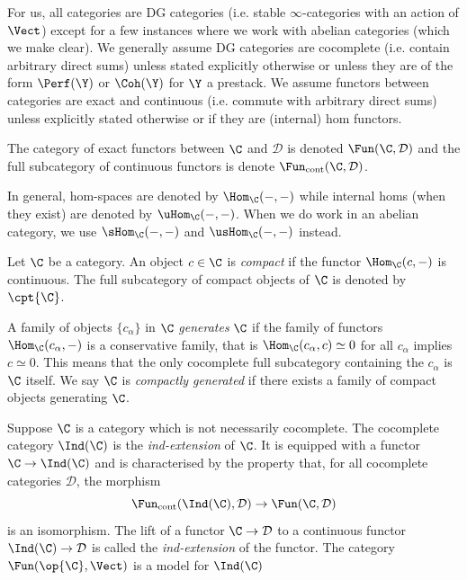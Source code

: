 \documentclass{amsart}
\begin{document}
  For us, all categories are DG categories (i.e. stable \(\infty\)-categories
  with an action of \(\Vect\)) except for a few instances where 
  we work with abelian categories (which we make clear).
  We generally assume DG categories are cocomplete (i.e. 
  contain arbitrary direct sums) unless stated explicitly otherwise
  or unless they are of the form \(\Perf(\Y)\) or \(\Coh(\Y)\)
  for \(\Y\) a prestack. We assume
  functors between categories are exact and continuous (i.e. commute with
  arbitrary direct sums) unless explicitly stated otherwise or
  if they are (internal) hom functors. 

  The category of exact
  functors between \(\C\) and \(\mathcal{D}\) is denoted \(\Fun(\C, \mathcal{D})\)
  and the full subcategory of continuous functors is
  denote \(\Fun_{\text{cont}}(\C, \mathcal{D})\).

  In general, hom-spaces are denoted by \(\Hom_\C(-,-)\)
  while internal homs (when they exist) are denoted by \(\uHom_\C(-,-)\).
  When we do work in an abelian category, we use \(\sHom_\C(-,-)\) 
  and \(\usHom_\C(-,-)\) instead.

  \sssec{}
  
  Let \(\C\) be a category. An object \(c\in \C\) is \emph{compact}
  if the functor \(\Hom_\C(c,-)\) is continuous.
  The full subcategory of compact objects of \(\C\) is
  denoted by \(\cpt{\C}\).

  \sssec{}

  A family of objects \(\{c_\alpha\}\) in \(\C\) \emph{generates}
  \(\C\) if the family of functors \(\Hom_\C(c_\alpha, -)\)
  is a conservative family, that is \(\Hom_\C(c_\alpha, c) \simeq 0\)
  for all \(c_\alpha\) implies \(c \simeq 0\). This means
  that the only cocomplete full subcategory containing
  the \(c_\alpha\) is \(\C\) itself. We say \(\C\) is
  \emph{compactly generated} if there exists a family
  of compact objects generating \(\C\).

  \sssec{}

  Suppose \(\C\) is a category which is not necessarily cocomplete.
  The cocomplete category \(\Ind(\C)\) is the \emph{ind-extension}
  of \(\C\). It is equipped with a functor \(\C \to \Ind(\C)\)
  and is characterised by the property that, for all cocomplete
  categories \(\mathcal{D}\), the morphism
  \begin{displaymath}
    \Fun_{\text{cont}}(\Ind(\C), \mathcal{D}) \to \Fun(\C, \mathcal{D})
  \end{displaymath}
  is an isomorphism. The lift of a functor \(\C \to \mathcal{D}\) to 
  a continuous functor \(\Ind(\C) \to \mathcal{D}\) is
  called the \emph{ind-extension} of the functor.
  The category \(\Fun(\op{\C}, \Vect)\) is
  a model for \(\Ind(\C)\)
\end{document}
